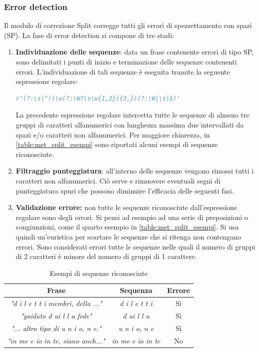 \subsubsection{Error detection}
\label{sec:met_split_errdet}
Il modulo di correzione Split corregge tutti gli errori di spezzettamento con spazi (SP).
La fase di error detection si compone di tre stadi:
\begin{enumerate}
\item \textbf{Individuazione delle sequenze}: data un frase contenente errori di tipo SP, sono delimitati i punti di inizio e terminazione delle sequenze contenenti errori. L'individuazione di tali sequenze è eseguita tramite la seguente espressione regolare:
\begin{lstlisting}[language=Python]
r'(?:\s|^)(\w(?:\W?\s\w{1,2}){3,})(?:\W|\s|$)'
\end{lstlisting}
La precedente espressione regolare intercetta tutte le sequenze di almeno tre gruppi di caratteri alfanumerici con lunghezza massima due intervallati da spazi e/o caratteri non alfanumerici. Per maggiore chiarezza, in \autoref{table:met_split_esempi} sono riportati alcuni esempi di sequenze riconosciute.

\item \textbf{Filtraggio punteggiatura}: all'interno delle sequenze vengono rimossi tutti i caratteri non alfanumerici. Ciò serve e rimuovere eventuali segni di punteggiatura spuri che possono diminuire l'efficacia delle seguenti fasi.

\item \textbf{Validazione errore:} non tutte le sequenze riconosciute dall'espressione regolare sono degli errori. Si pensi ad esempio ad una serie di preposizioni o congiunzioni, come il quarto esempio in \autoref{table:met_split_esempi}. Si usa quindi un'euristica per scartare le sequenze che si ritenga non contengano errori. Sono considerati errori tutte le sequenze nelle quali il numero di gruppi di 2 caratteri è minore del numero di gruppi di 1 carattere.

\end{enumerate}


\begin{table}[H]
	\centering
	\begin{tabular}{ccc}
	\textbf{Frase} & \textbf{Sequenza} & \textbf{Errore} \\ \hline
	
	\textit{"d i l e t t i membri, della ..."}	&	\textit{d i l e t t i}	&	Sì \\
	\textit{"guidato d ui l l a fede"}			& 	\textit{d ui l l a}		&	Sì \\
	\textit{"... altro tipo di u n i o, n e."}	&	\textit{u n i o, n e}	&	Sì \\
	\textit{"in me e io in te, siano anch..."}	&	\textit{in me e io in te}&	No
	\end{tabular}
	\caption{Esempi di sequenze riconosciute}
	\label{table:met_split_esempi}
\end{table}

